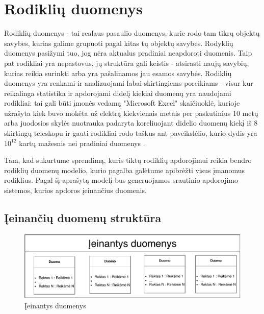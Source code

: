 \documentclass{VUMIFPSbakalaurinis}
\begin{document}
\section{Rodiklių duomenys}

Rodiklių duomenys - tai realaus pasaulio duomenys, kurie rodo tam tikrų objektų savybes, kurias galime grupuoti pagal kitas tų objektų savybes. Rodyklių duomenys pasižymi tuo, jog nėra aktualus pradiniai neapdoroti duomenis. Taip pat rodikliai yra nepastovus, jų struktūra gali keistis - atsirasti naujų savybių, kurias reikia surinkti arba yra pašalinamos jau esamos savybės. Rodiklių duomenys yra renkami ir analizuojami labai skirtingiems poreikiams - visur kur reikalinga statistika ir apdorojami didelį kiekiai duomenų yra naudojami rodikliai: tai gali būti įmonės vedamą "Microsoft Excel" skaičiuoklė, kurioje užrašyta kiek buvo mokėta už elektrą kiekvienais metais per paskutinius 10 metų arba juodosios skylės nuotrauka padaryta koreliuojant didelio duomenų kiekį iš 8 skirtingų teleskopu ir gauti rodikliai rodo taškus ant paveikslėlio, kurio dydis yra \(10^{12}\) kartų mažesnis nei pradiniai duomenys \cite{akiyama2019first}. \par    
Tam, kad sukurtume sprendimą, kuris tiktų rodiklių apdorojimui reikia bendro rodiklių duomenų modelio, kurio pagalba galėtume apibrėžti visus įmanomus rodiklius. Pagal šį aprašytą modelį bus generuojamos srautinio apdorojimo sistemos, kurios apdoros įeinančius duomenis.

\subsection{Įeinančių duomenų struktūra}

\begin{figure}[H]
    \centering
    \includegraphics[width=1\textwidth]{img/duomenys.pdf}
    \caption{Įeinantys duomenys}
    \label{img:duomenys}
\end{figure}
\end{document}
